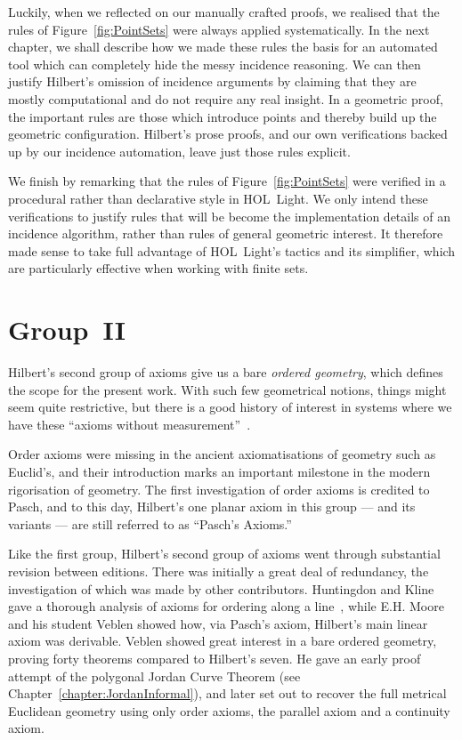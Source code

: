 Luckily, when we reflected on our manually crafted proofs, we realised that the rules of Figure~\ref{fig:PointSets} were always applied systematically. In the next chapter, we shall describe how we made these rules the basis for an automated tool which can completely hide the messy incidence reasoning. We can then justify Hilbert's omission of incidence arguments by claiming that they are mostly computational and do not require any real insight. In a geometric proof, the important rules are those which introduce points and thereby build up the geometric configuration. Hilbert's prose proofs, and our own verifications backed up by our incidence automation, leave just those rules explicit.

We finish by remarking that the rules of Figure~\ref{fig:PointSets} were verified in a procedural rather than declarative style in HOL~Light. We only intend these verifications to justify rules that will be become the implementation details of an incidence algorithm, rather than rules of general geometric interest. It therefore made sense to take full advantage of HOL~Light's tactics and its simplifier, which are particularly effective when working with finite sets.  

\section{Group~II}
Hilbert's second group of axioms give us a bare \emph{ordered geometry}, which defines the scope for the present work. With such few geometrical notions, things might seem quite restrictive, but there is a good history of interest in systems where we have these ``axioms without measurement''~\cite{AxiomaticsOrderedGeometry}. 

Order axioms were missing in the ancient axiomatisations of geometry such as Euclid's, and their introduction marks an important milestone in the modern rigorisation of geometry. The first investigation of order axioms is credited to Pasch, and to this day, Hilbert's one planar axiom in this group --- and its variants --- are still referred to as ``Pasch's Axioms.''

Like the first group, Hilbert's second group of axioms went through substantial revision between editions. There was initially a great deal of redundancy, the investigation of which was made by other contributors. Huntingdon and Kline gave a thorough analysis of axioms for ordering along a line~\cite{AnalysisBetweenness}, while E.H. Moore and his student Veblen showed how, via Pasch's axiom, Hilbert's main linear axiom was derivable. Veblen showed great interest in a bare ordered geometry, proving forty theorems compared to Hilbert's seven. He gave an early proof attempt of the polygonal Jordan Curve Theorem (see Chapter~\ref{chapter:JordanInformal}), and later set out to recover the full metrical Euclidean geometry using only order axioms, the parallel axiom and a continuity axiom.

